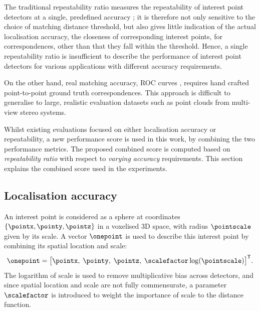 The traditional repeatability ratio measures the repeatability of interest point detectors at a single, predefined accuracy \cite{Schmid2000}; it is therefore not only sensitive to the choice of matching distance threshold, but also gives little indication of the actual localisation accuracy, \ie the closeness of corresponding interest points, for correspondences, other than that they fall within the threshold. Hence, a single repeatability ratio is insufficient to describe the performance of interest point detectors for various applications with different accuracy requirements. 

On the other hand, real matching accuracy, \eg ROC curves \cite{Bowyer1999}, requires hand crafted point-to-point ground truth correspondences. This approach is difficult to generalise to large, realistic evaluation datasets such as point clouds from multi-view stereo systems.     

Whilst existing evaluations focused on either localisation accuracy or repeatability, a new performance score is used in this work, by combining the two performance metrics. The proposed combined score is computed based on \emph{repeatability ratio} with respect to \emph{varying accuracy} requirements. This section explains the combined score used in the experiments. 

\subsection{Localisation accuracy}
An interest point is considered as a sphere at coordinates $\{\pointx, \pointy, \pointz\}$ in a voxelised 3D space, with radius $\pointscale$ given by its scale. A vector $\onepoint$ is used to describe this interest point by combining its spatial location and scale: 
\begin{equation}
	\onepoint = \big[ \pointx,\;\pointy,\;\pointz,\;\scalefactor\log(\pointscale) \big]^\mathsf{T}.
\label{eqn/eval/loc_vec}
\end{equation}
The logarithm of scale is used to remove multiplicative bias across detectors, and since spatial location and scale are not fully commensurate, a parameter $\scalefactor$ is introduced to weight the importance of scale to the distance function.

